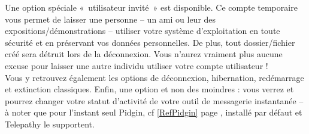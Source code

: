 Une option spéciale «~utilisateur invité~» est disponible. Ce compte temporaire vous permet de laisser une personne -- un ami ou leur des expositions/démonstrations -- utiliser votre système d'exploitation en toute sécurité et en préservant vos données personnelles. De plus, tout dossier/fichier créé sera détruit lors de la déconnexion. Vous n'aurez vraiment plus aucune excuse pour laisser une autre individu utiliser votre compte utilisateur !\\
Vous y retrouvez également les options de déconnexion, hibernation, redémarrage et extinction classiques. Enfin, une option et non des moindres : vous verrez et pourrez changer votre statut d'activité de votre outil de messagerie instantanée -- à noter que pour l'instant seul Pidgin, cf \ref{RefPidgin} page \pageref{RefPidgin}, installé par défaut et Telepathy le supportent.
\IconeBarreHaut
